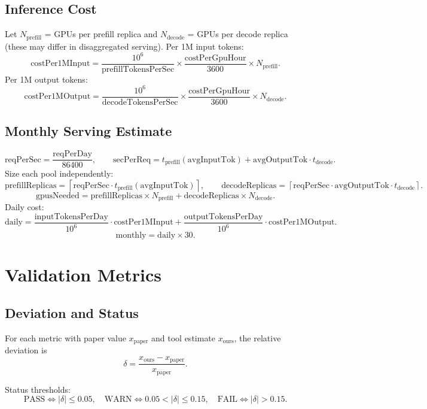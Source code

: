 \documentclass[11pt]{article}
\begin{document}
\subsection{Inference Cost}
Let $N_{\mathrm{prefill}}$ = GPUs per prefill replica and $N_{\mathrm{decode}}$ = GPUs per decode replica (these may differ in disaggregated serving). Per 1M input tokens:
\[
\mathrm{costPer1MInput} = \frac{10^{6}}{\mathrm{prefillTokensPerSec}} \times \frac{\mathrm{costPerGpuHour}}{3600} \times N_{\mathrm{prefill}}.
\]
Per 1M output tokens:
\[
\mathrm{costPer1MOutput} = \frac{10^{6}}{\mathrm{decodeTokensPerSec}} \times \frac{\mathrm{costPerGpuHour}}{3600} \times N_{\mathrm{decode}}.
\]

\subsection{Monthly Serving Estimate}
\[
\mathrm{reqPerSec} = \frac{\mathrm{reqPerDay}}{86400}, \qquad \mathrm{secPerReq} = t_{\mathrm{prefill}}(\mathrm{avgInputTok}) + \mathrm{avgOutputTok} \cdot t_{\mathrm{decode}}.
\]
Size each pool independently:
\[
\mathrm{prefillReplicas} = \left\lceil \mathrm{reqPerSec} \cdot t_{\mathrm{prefill}}(\mathrm{avgInputTok}) \right\rceil, \qquad \mathrm{decodeReplicas} = \left\lceil \mathrm{reqPerSec} \cdot \mathrm{avgOutputTok} \cdot t_{\mathrm{decode}} \right\rceil.
\]
\[
\mathrm{gpusNeeded} = \mathrm{prefillReplicas} \times N_{\mathrm{prefill}} + \mathrm{decodeReplicas} \times N_{\mathrm{decode}}.
\]
Daily cost:
\[
\text{daily} = \frac{\mathrm{inputTokensPerDay}}{10^{6}} \cdot \mathrm{costPer1MInput} + \frac{\mathrm{outputTokensPerDay}}{10^{6}} \cdot \mathrm{costPer1MOutput}.
\]
\[
\text{monthly} = \text{daily} \times 30.
\]

\section{Validation Metrics}

\subsection{Deviation and Status}

For each metric with paper value $x_{\text{paper}}$ and
tool estimate $x_{\text{ours}}$, the relative deviation is
\[
\delta = \frac{x_{\text{ours}} - x_{\text{paper}}}{x_{\text{paper}}}.
\]

Status thresholds:
\[
\text{PASS} \iff |\delta| \le 0.05,
\quad
\text{WARN} \iff 0.05 < |\delta| \le 0.15,
\quad
\text{FAIL} \iff |\delta| > 0.15.
\]
\end{document}
